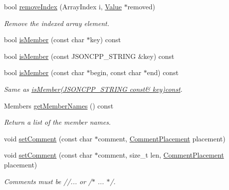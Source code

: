 \begin{DoxyCompactItemize}
bool \hyperlink{classJson_1_1Value_ae9e67e08a85a2f3be3396ec0f4c47f65}{remove\+Index} (Array\+Index i, \hyperlink{classJson_1_1Value}{Value} $\ast$removed)
\begin{DoxyCompactList}\small\item\em Remove the indexed array element. \end{DoxyCompactList}\item 
bool \hyperlink{classJson_1_1Value_ad6d4df2227321bab05e86667609a7fad}{is\+Member} (const char $\ast$key) const
\item 
bool \hyperlink{classJson_1_1Value_a0c2cd838217b23ee6bde8135de1b30d9}{is\+Member} (const J\+S\+O\+N\+C\+P\+P\+\_\+\+S\+T\+R\+I\+NG \&key) const
\item 
\mbox{\label{classJson_1_1Value_a2007e1e51f21f44ecf1f13e4a1c567b9}} 
bool \hyperlink{classJson_1_1Value_a2007e1e51f21f44ecf1f13e4a1c567b9}{is\+Member} (const char $\ast$begin, const char $\ast$end) const
\begin{DoxyCompactList}\small\item\em Same as \hyperlink{classJson_1_1Value_a0c2cd838217b23ee6bde8135de1b30d9}{is\+Member(\+J\+S\+O\+N\+C\+P\+P\+\_\+\+S\+T\+R\+I\+N\+G const\& key)const}. \end{DoxyCompactList}\item 
Members \hyperlink{classJson_1_1Value_a79d7725dce6260317333e69022367ac9}{get\+Member\+Names} () const
\begin{DoxyCompactList}\small\item\em Return a list of the member names. \end{DoxyCompactList}\item 
void \hyperlink{classJson_1_1Value_a29f3a30f7e5d3af6f38d57999bf5b480}{set\+Comment} (const char $\ast$comment, \hyperlink{namespaceJson_a4fc417c23905b2ae9e2c47d197a45351}{Comment\+Placement} placement)
\item 
\mbox{\label{classJson_1_1Value_a2900152a2887b410a9ddabe278b9d492}} 
void \hyperlink{classJson_1_1Value_a2900152a2887b410a9ddabe278b9d492}{set\+Comment} (const char $\ast$comment, size\+\_\+t len, \hyperlink{namespaceJson_a4fc417c23905b2ae9e2c47d197a45351}{Comment\+Placement} placement)
\begin{DoxyCompactList}\small\item\em Comments must be //... or /$\ast$ ... $\ast$/. \end{DoxyCompactList}\item 

\end{DoxyCompactItemize}
